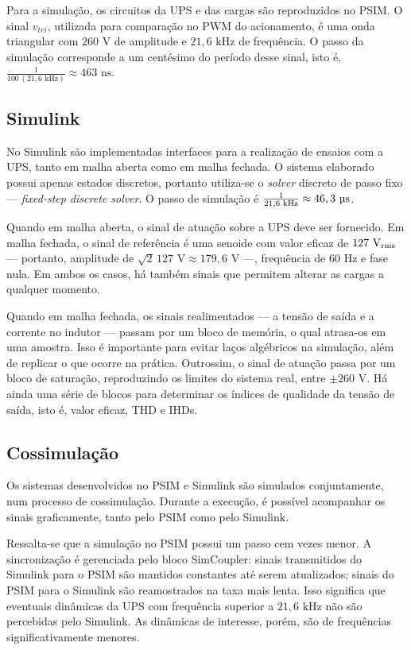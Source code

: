 \documentclass[repeatfields,oneside,overleaf]{tcc}
\newcommand{\mycdot}{ \, }
\begin{document}
Para a simulação, os circuitos da UPS e das cargas são reproduzidos no PSIM.
O sinal $v_{tri}$, utilizada para comparação no PWM do acionamento, é uma onda triangular com $260 \text{ V}$ de amplitude e $21,6 \text{ kHz}$ de frequência.
O passo da simulação corresponde a um centésimo do período desse sinal, isto é, $\frac{1}{ 100 \mycdot \left( 21,6 \text{ kHz} \right) } \approx 463 \text { ns}$.

\subsection{Simulink}

No Simulink são implementadas interfaces para a realização de ensaios com a UPS, tanto em malha aberta como em malha fechada.
O sistema elaborado possui apenas estados discretos, portanto utiliza-se o \textit{solver} discreto de passo fixo --- \textit{fixed-step discrete solver}.
O passo de simulação é $\frac{1}{ 21,6 \text{ kHz} } \approx 46,3 \text { \textmu s}$.

Quando em malha aberta, o sinal de atuação sobre a UPS deve ser fornecido.
Em malha fechada, o sinal de referência é uma senoide com valor eficaz de $127 \text{ V\textsubscript{rms}}$ --- portanto, amplitude de $\sqrt{2} \mycdot 127 \text{ V} \approx  179,6 \text{ V}$ ---, frequência de $60 \text{ Hz}$ e fase nula.
Em ambos os casos, há também sinais que permitem alterar as cargas a qualquer momento.

Quando em malha fechada, os sinais realimentados --- a tensão de saída e a corrente no indutor --- passam por um bloco de memória, o qual atrasa-os em uma amostra.
Isso é importante para evitar laços algébricos na simulação, além de replicar o que ocorre na prática.
Outrossim, o sinal de atuação passa por um bloco de saturação, reproduzindo os limites do sistema real, entre $\pm 260 \text{ V}$.
Há ainda uma série de blocos para determinar os índices de qualidade da tensão de saída, isto é, valor eficaz, THD e IHDs.

\subsection{Cossimulação}

Os sistemas desenvolvidos no PSIM e Simulink são simulados conjuntamente, num processo de cossimulação.
Durante a execução, é possível acompanhar os sinais graficamente, tanto pelo PSIM como pelo Simulink.

Ressalta-se que a simulação no PSIM possui um passo cem vezes menor.
A sincronização é gerenciada pelo bloco SimCoupler: sinais transmitidos do Simulink para o PSIM são mantidos constantes até serem atualizados; sinais do PSIM para o Simulink são reamostrados na taxa mais lenta.
Isso significa que eventuais dinâmicas da UPS com frequência superior a $21,6 \text{ kHz}$ não são percebidas pelo Simulink.
As dinâmicas de interesse, porém, são de frequências significativamente menores.
\end{document}
